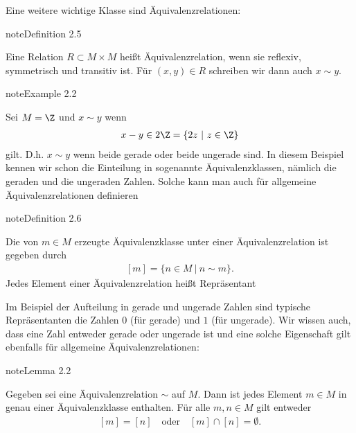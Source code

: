 \documentclass[letterpaper,10pt,english]{jupyterBook}
\begin{document}
Eine weitere wichtige Klasse sind Äquivalenzrelationen:
\label{grundlagen/mengenlogik:definition-6}
\begin{sphinxadmonition}{note}{Definition 2.5}



Eine Relation \(R \subset M \times M\) heißt Äquivalenzrelation, wenn sie reflexiv, symmetrisch und transitiv ist. Für \((x,y) \in R\) schreiben wir dann auch \(x \sim y\).
\end{sphinxadmonition}
\label{grundlagen/mengenlogik:example-7}
\begin{sphinxadmonition}{note}{Example 2.2}



Sei \(M= \Z\) und \(x \sim y\) wenn
\begin{equation*}
\begin{split}x-y \in 2 \Z = \{ 2 z ~|~z \in \Z \}\end{split}
\end{equation*}
gilt. D.h. \(x \sim y\) wenn beide gerade oder beide ungerade sind. In diesem Beispiel kennen wir schon die Einteilung in sogenannte Äquivalenzklassen, nämlich die geraden und die ungeraden Zahlen. Solche kann man auch für allgemeine Äquivalenzrelationen definieren
\end{sphinxadmonition}
\label{grundlagen/mengenlogik:definition-8}
\begin{sphinxadmonition}{note}{Definition 2.6}



Die von \(m \in M\) erzeugte Äquivalenzklasse unter einer Äquivalenzrelation ist gegeben durch
\begin{equation*}
\begin{split} [m] = \{ n \in M ~|~n \sim m\}.\end{split}
\end{equation*}
Jedes Element einer Äquivalenzrelation heißt Repräsentant
\end{sphinxadmonition}

Im Beispiel der Aufteilung in gerade und ungerade Zahlen sind typische Repräsentanten die Zahlen \(0\) (für gerade) und \(1\) (für ungerade). Wir wissen auch, dass eine Zahl entweder gerade oder ungerade ist und eine solche Eigenschaft gilt ebenfalls für allgemeine Äquivalenzrelationen:
\label{grundlagen/mengenlogik:lemma-9}
\begin{sphinxadmonition}{note}{Lemma 2.2}



Gegeben sei eine Äquivalenzrelation \(\sim\) auf \(M\). Dann ist jedes Element \(m \in M\) in genau einer Äquivalenzklasse enthalten. Für alle \(m,n \in M\) gilt entweder
\begin{equation*}
\begin{split}[m] = [n] \quad \text{oder} \quad [m] \cap [n] = \emptyset .\end{split}
\end{equation*}\end{sphinxadmonition}
\end{document}
